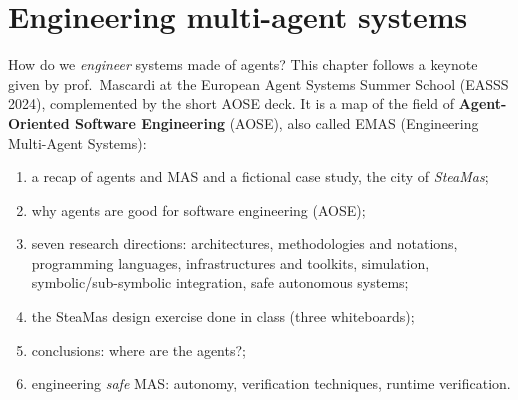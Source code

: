\section{Engineering multi-agent systems}
\label{sec:engineering-mas}

How do we \emph{engineer} systems made of agents? This chapter follows a keynote given by
prof.\ Mascardi at the European Agent Systems Summer School (EASSS 2024), complemented by
the short AOSE deck. It is a map of the field of \textbf{Agent-Oriented Software Engineering}
(AOSE), also called EMAS (Engineering
Multi-Agent Systems):
\begin{enumerate}[nosep]
  \item a recap of agents and MAS and a fictional case study, the city of \emph{SteaMas};
  \item why agents are good for software engineering (AOSE);
  \item seven research directions: architectures, methodologies and notations, programming
        languages, infrastructures and toolkits, simulation, symbolic/sub-symbolic
        integration, safe autonomous systems;
  \item the SteaMas design exercise done in class (three whiteboards);
  \item conclusions: where are the agents?;
  \item engineering \emph{safe} MAS: autonomy, verification techniques, runtime verification.
\end{enumerate}








